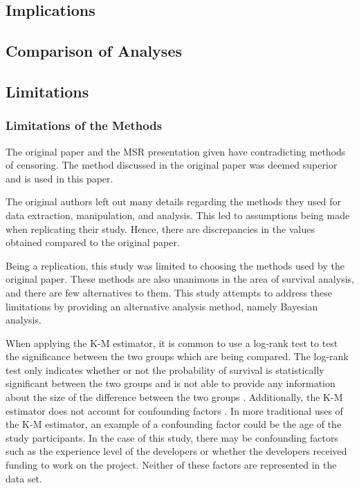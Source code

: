 \documentclass[acmconf]{acmart}
\begin{document}
\subsection{Implications} \label{implications}

\subsection{Comparison of Analyses} \label{compare}


\subsection{Limitations} \label{limit}

\subsubsection{Limitations of the Methods} \label{limit-methods}

The original paper \cite{ali2020cheating} and the MSR presentation given \cite{ali2020video} have contradicting methods of censoring.
The method discussed in the original paper was deemed superior and is used in this paper.

The original authors left out many details regarding the methods they used for data extraction, manipulation, and analysis.
This led to assumptions being made when replicating their study.
Hence, there are discrepancies in the values obtained compared to the original paper.

Being a replication, this study was limited to choosing the methods used by the original paper.
These methods are also unanimous in the area of survival analysis, and there are few alternatives to them.
This study attempts to address these limitations by providing an alternative analysis method, namely Bayesian analysis.

When applying the K-M estimator, it is common to use a log-rank test to test the significance between the two groups which are being compared.
The log-rank test only indicates whether or not the probability of survival is statistically significant between the two groups and is not able to provide any information about the size of the difference between the two groups \cite{stel2011kaplan}.
Additionally, the K-M estimator does not account for confounding factors \cite{stel2011kaplan}.
In more traditional uses of the K-M estimator, an example of a confounding factor could be the age of the study participants.
In the case of this study, there may be confounding factors such as the experience level of the developers or whether the developers received funding to work on the project.
Neither of these factors are represented in the data set.
\end{document}
